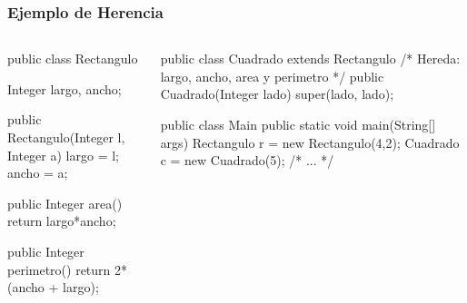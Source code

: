 \documentclass{beamer}
\begin{document}
\begin{frame}[fragile]
  \frametitle{Ejemplo de Herencia}

     \begin{columns}
       \begin{column}{0.45\textwidth}
         \begin{jsmall}
           public class Rectangulo {
             Integer largo, ancho;

             public Rectangulo(Integer l,
                               Integer a) {
              largo = l;
              ancho = a;                               
             }

             public Integer area() {
               return largo*ancho;
             }

             public Integer perimetro() {
               return 2*(ancho + largo);
             }
           }           
         \end{jsmall}
     \end{column}
    \begin{column}{0.55\textwidth}      
      \begin{jsmall}
        public class Cuadrado
        extends Rectangulo {
          /* Hereda: largo, ancho,
          area y perimetro */
          public Cuadrado(Integer lado) {
            super(lado, lado);
          }
        }

        public class Main {
          public static
          void main(String[] args) {
            Rectangulo r = new Rectangulo(4,2);
            Cuadrado c   = new Cuadrado(5);
            /* ... */
          }
        }
      \end{jsmall}      
    \end{column}
  \end{columns}  
  
\end{frame}
\end{document}
